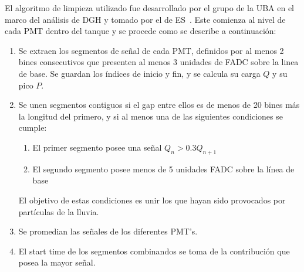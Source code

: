 		El algoritmo de limpieza utilizado fue desarrollado por el grupo de la UBA en el marco del an\'alisis de DGH y tomado por el de ES~\cite{trace_cleaning,cite:tesisJavier,cite:tesisYann}.
		Este comienza al nivel de cada PMT dentro del tanque y se procede como se describe a continuaci\'on:
		\begin{enumerate}
		 \item Se extraen los segmentos de señal de cada PMT, definidos por al menos 2 bines consecutivos que presenten al menos 3 unidades de FADC sobre la linea de base.
		 Se guardan los índices de inicio y fin, y se calcula su carga $Q$ y su pico $P$.
		 \item Se unen segmentos contiguos si el gap entre ellos es de menos de 20 bines más la longitud del primero, y si al menos una de las siguientes condiciones se cumple:
		 \begin{enumerate}
		  \item El primer segmento posee una señal $Q_n>0.3Q_{n+1}$
		  \item El segundo segmento posee menos de 5 unidades FADC sobre la línea de base
		 \end{enumerate}
		El objetivo de estas condiciones es unir los que hayan sido provocados por partículas de la lluvia.
		\item Se promedian las señales de los diferentes PMT's.
		\item El start time de los segmentos combinandos se toma de la contribución que posea la mayor señal.
		\end{enumerate}
		
